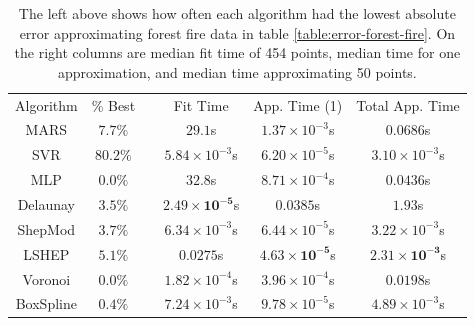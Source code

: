 \documentclass[smallextended,final]{svjour3}       %
\begin{document}
\begin{appendix}
\begin{table}
  \centering
  \begin{tabular}{|c|c| c |c|c|c|}
    \cline{1-2}\cline{4-6}
    Algorithm & \% Best &  & Fit Time & App. Time (1) & Total App. Time\\
    \cline{1-2}\cline{4-6}
    MARS & $\mathit{7.7}\%$ &  & $29.1$s & $1.37 \times 10^{-3}$s & $0.0686$s\\
    SVR & $\mathbf{80.2}\%$ &  & $5.84 \times 10^{-3}$s & $\mathit{6.20 \times 10^{-5}}$s & $\mathit{3.10 \times 10^{-3}}$s\\
    MLP & $0.0\%$ &  & $32.8$s & $8.71 \times 10^{-4}$s & $0.0436$s\\
    Delaunay & $3.5\%$ &  & $\mathbf{2.49 \times 10^{-5}}$s & $0.0385$s & $1.93$s\\
    ShepMod & $3.7\%$ &  & $6.34 \times 10^{-3}$s & $6.44 \times 10^{-5}$s & $3.22 \times 10^{-3}$s\\
    LSHEP & $5.1\%$ &  & $0.0275$s & $\mathbf{4.63 \times 10^{-5}}$s & $\mathbf{2.31 \times 10^{-3}}$s\\
    Voronoi & $0.0\%$ &  & $\mathit{1.82 \times 10^{-4}}$s & $3.96 \times 10^{-4}$s & $0.0198$s\\
    BoxSpline & $0.4\%$ &  & $7.24 \times 10^{-3}$s & $9.78 \times 10^{-5}$s & $4.89 \times 10^{-3}$s\\
    \cline{1-2}\cline{4-6}
  \end{tabular}
  \caption{The left above shows how often each algorithm had the
    lowest absolute error approximating forest fire data in table
    \ref{table:error-forest-fire}. On the right columns are median fit
    time of 454 points, median time for one approximation, and median
    time approximating 50 points.}
  \label{table:best-forest-fire}
\end{table}



\end{appendix}
\end{document}
